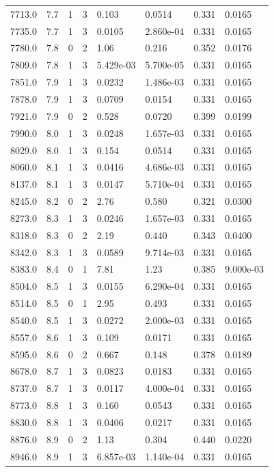 \documentclass[preview]{standalone}
\begin{document}
{{{{{\begin{tabular}{L{1.2cm}C{1.2cm} C{0.3cm}C{0.5cm} C{1.4cm}C{1.4cm} C{1.4cm}C{1.4cm}}
  7713.0  &   7.7  & 1     &  3 &  0.103  & 0.0514  & 0.331 &  0.0165   \\ 
  7735.0  &   7.7  & 1     &  3 &  0.0105  & 2.860e-04  & 0.331 &  0.0165   \\ 
  7780.0  &   7.8  & 0     &  2 &  1.06  & 0.216  & 0.352 &  0.0176   \\ 
  7809.0  &   7.8  & 1     &  3 &  5.429e-03  & 5.700e-05  & 0.331 &  0.0165   \\ 
  7851.0  &   7.9  & 1     &  3 &  0.0232  & 1.486e-03  & 0.331 &  0.0165   \\ 
  7878.0  &   7.9  & 1     &  3 &  0.0709  & 0.0154  & 0.331 &  0.0165   \\ 
  7921.0  &   7.9  & 0     &  2 &  0.528  & 0.0720  & 0.399 &  0.0199   \\ 
  7990.0  &   8.0  & 1     &  3 &  0.0248  & 1.657e-03  & 0.331 &  0.0165   \\ 
  8029.0  &   8.0  & 1     &  3 &  0.154  & 0.0514  & 0.331 &  0.0165   \\ 
  8060.0  &   8.1  & 1     &  3 &  0.0416  & 4.686e-03  & 0.331 &  0.0165   \\ 
  8137.0  &   8.1  & 1     &  3 &  0.0147  & 5.710e-04  & 0.331 &  0.0165   \\ 
  8245.0  &   8.2  & 0     &  2 &  2.76  & 0.580  & 0.321 &  0.0300   \\ 
  8273.0  &   8.3  & 1     &  3 &  0.0246  & 1.657e-03  & 0.331 &  0.0165   \\ 
  8318.0  &   8.3  & 0     &  2 &  2.19  & 0.440  & 0.343 &  0.0400   \\ 
  8342.0  &   8.3  & 1     &  3 &  0.0589  & 9.714e-03  & 0.331 &  0.0165   \\ 
  8383.0  &   8.4  & 0     &  1 &  7.81  & 1.23  & 0.385 &  9.000e-03   \\ 
  8504.0  &   8.5  & 1     &  3 &  0.0155  & 6.290e-04  & 0.331 &  0.0165   \\ 
  8514.0  &   8.5  & 0     &  1 &  2.95  & 0.493  & 0.331 &  0.0165   \\ 
  8540.0  &   8.5  & 1     &  3 &  0.0272  & 2.000e-03  & 0.331 &  0.0165   \\ 
  8557.0  &   8.6  & 1     &  3 &  0.109  & 0.0171  & 0.331 &  0.0165   \\ 
  8595.0  &   8.6  & 0     &  2 &  0.667  & 0.148  & 0.378 &  0.0189   \\ 
  8678.0  &   8.7  & 1     &  3 &  0.0823  & 0.0183  & 0.331 &  0.0165   \\ 
  8737.0  &   8.7  & 1     &  3 &  0.0117  & 4.000e-04  & 0.331 &  0.0165   \\ 
  8773.0  &   8.8  & 1     &  3 &  0.160  & 0.0543  & 0.331 &  0.0165   \\ 
  8830.0  &   8.8  & 1     &  3 &  0.0406  & 0.0217  & 0.331 &  0.0165   \\ 
  8876.0  &   8.9  & 0     &  2 &  1.13  & 0.304  & 0.440 &  0.0220   \\ 
  8946.0  &   8.9  & 1     &  3 &  6.857e-03  & 1.140e-04  & 0.331 &  0.0165   \\ 
\hline 
\end{tabular} 

}}}}}
\end{document}
